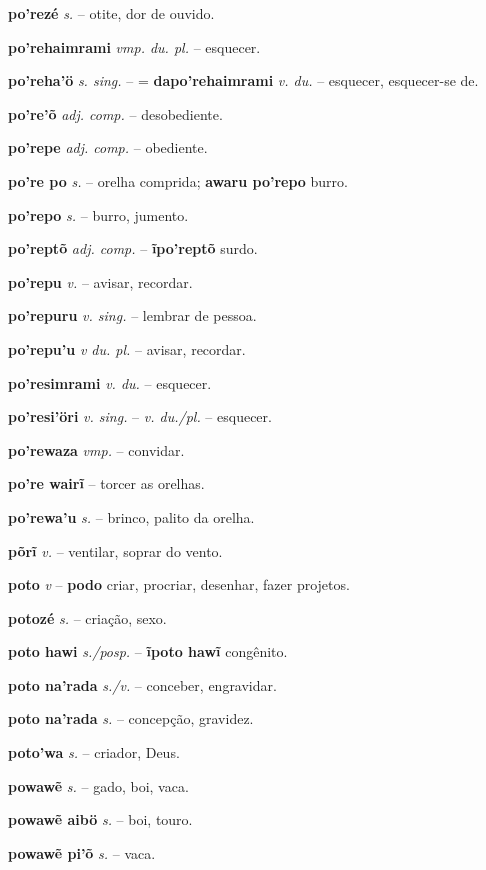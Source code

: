 \textbf{po'rezé} \textit{s.} -- otite, dor de ouvido.

\textbf{po'rehaimrami} \textit{vmp. du. pl.} -- esquecer.

\textbf{po'reha'ö} \textit{s. sing.} -- = \textbf{dapo'rehaimrami} \textit{v. du.} -- esquecer, esquecer-se de.

\textbf{po're'õ} \textit{adj. comp.} -- desobediente.

\textbf{po'repe} \textit{adj. comp.} -- obediente.

\textbf{po're po} \textit{s.} -- orelha comprida; \textbf{awaru po'repo} burro.

\textbf{po'repo} \textit{s.} -- burro, jumento.

\textbf{po'reptõ} \textit{adj. comp.} -- \textbf{ĩpo'reptõ} surdo.

\textbf{po'repu} \textit{v.} -- avisar, recordar.

\textbf{po'repuru} \textit{v. sing.} -- lembrar de pessoa.

\textbf{po'repu'u} \textit{v du. pl.} -- avisar, recordar.

\textbf{po'resimrami} \textit{v. du.} -- esquecer.

\textbf{po'resi'öri} \textit{v. sing.} -- \textit{v. du./pl.} -- esquecer.

\textbf{po'rewaza} \textit{vmp.} -- convidar.

\textbf{po're wairĩ} \textit{} -- torcer as orelhas.

\textbf{po'rewa'u} \textit{s.} -- brinco, palito da orelha.

\textbf{põrĩ} \textit{v.} -- ventilar, soprar do vento.

\textbf{poto} \textit{v} -- \textbf{podo} criar, procriar, desenhar, fazer projetos.

\textbf{potozé} \textit{s.} -- criação, sexo.

\textbf{poto hawi} \textit{s./posp.} -- \textbf{ĩpoto hawĩ} congênito.

\textbf{poto na'rada} \textit{s./v.} -- conceber, engravidar.

\textbf{poto na'rada} \textit{s.} -- concepção, gravidez.

\textbf{poto'wa} \textit{s.} -- criador, Deus.

\textbf{powawẽ} \textit{s.} -- gado, boi, vaca.

\textbf{powawẽ aibö} \textit{s.} -- boi, touro.

\textbf{powawẽ pi'õ} \textit{s.} -- vaca.

